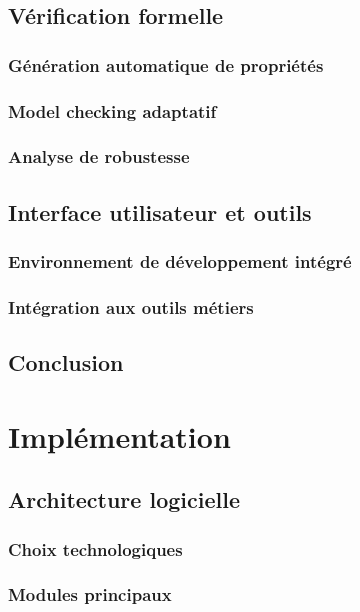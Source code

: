 \documentclass[a4paper,12pt]{article}
\begin{document}
\subsection{Vérification formelle}
\label{sec:org46bb08b}
\subsubsection{Génération automatique de propriétés}
\label{sec:orgb6349a5}
\subsubsection{Model checking adaptatif}
\label{sec:orgf024cdc}
\subsubsection{Analyse de robustesse}
\label{sec:org5517e43}
\subsection{Interface utilisateur et outils}
\label{sec:org63863f0}
\subsubsection{Environnement de développement intégré}
\label{sec:org85215ef}
\subsubsection{Intégration aux outils métiers}
\label{sec:org2b25acd}
\subsection{Conclusion}
\label{sec:org4c81367}
\clearpage
\section{Implémentation}
\label{sec:orgef22b1d}
\subsection{Architecture logicielle}
\label{sec:org71e378a}
\subsubsection{Choix technologiques}
\label{sec:orgb06c2b1}
\subsubsection{Modules principaux}
\label{sec:org1e902e9}
\end{document}
